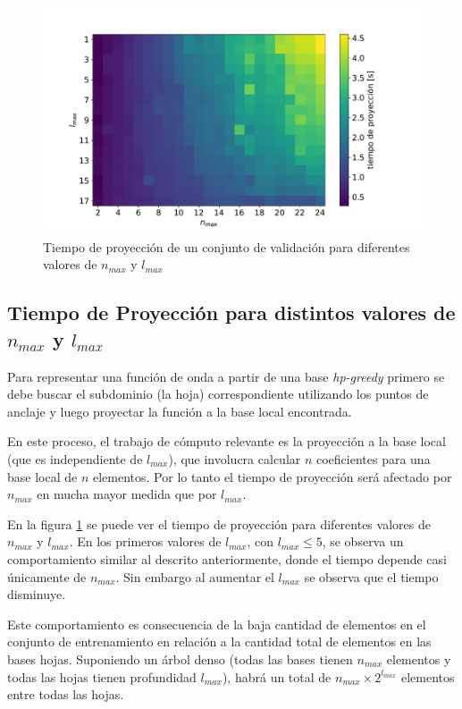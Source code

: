 \begin{figure}[h!]
\centering
\includegraphics[width=.9\columnwidth, trim={0, 1cm, 0, 1.4cm}]{figs/nmax_lmax_t_grid.pdf}
\caption{Tiempo de proyección de un conjunto de validación para diferentes valores de $n_{max}$ y $l_{max}$}
\label{fig:t_grilla_nl}
\end{figure}



\subsection{Tiempo de Proyección para distintos valores de $n_{max}$ y $l_{max}$}

Para representar una función de onda a partir de una base \textit{hp-greedy} primero se debe buscar el subdominio (la hoja) correspondiente utilizando los puntos de anclaje y luego proyectar la función a la base local encontrada. 

En este proceso, el trabajo de cómputo relevante es la proyección a la base local (que es independiente de $l_{max}$), que involucra calcular $n$ coeficientes para una base local de $n$ elementos. Por lo tanto el tiempo de proyección será afectado por $n_{max}$ en mucha mayor medida que por $l_{max}$. 

En la figura \ref{fig:t_grilla_nl} se puede ver el tiempo de proyección para diferentes valores de $n_{max}$ y $l_{max}$. En los primeros valores de $l_{max}$, con $l_{max} \leq 5$, se observa un comportamiento similar al descrito anteriormente, donde el tiempo depende casi únicamente de $n_{max}$. Sin embargo al aumentar el $l_{max}$ se observa que el tiempo disminuye. 


Este comportamiento es consecuencia de la baja cantidad de elementos en el conjunto de entrenamiento en relación a la cantidad total de elementos en las bases hojas. 
Suponiendo un árbol denso (todas las bases tienen $n_{max}$ elementos y todas las hojas tienen profundidad $l_{max}$), habrá un total de $n_{max} \times 2^{l_{max}}$ elementos entre todas las hojas. 

